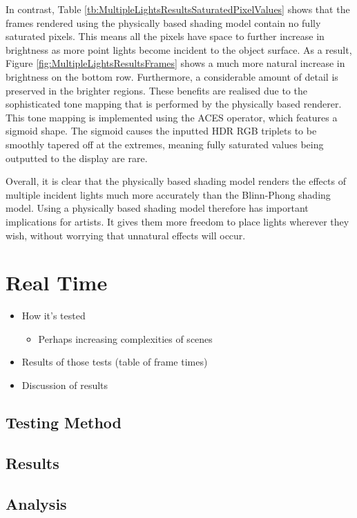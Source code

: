 In contrast, Table \ref{tb:MultipleLightsResultsSaturatedPixelValues} shows that the frames rendered using the physically based shading model contain no fully saturated pixels. This means all the pixels have space to further increase in brightness as more point lights become incident to the object surface. As a result, Figure \ref{fig:MultipleLightsResultsFrames} shows a much more natural increase in brightness on the bottom row. Furthermore, a considerable amount of detail is preserved in the brighter regions. These benefits are realised due to the sophisticated tone mapping that is performed by the physically based renderer. This tone mapping is implemented using the ACES operator, which features a sigmoid shape. The sigmoid causes the inputted HDR RGB triplets to be smoothly tapered off at the extremes, meaning fully saturated values being outputted to the display are rare.

Overall, it is clear that the physically based shading model renders the effects of multiple incident lights much more accurately than the Blinn-Phong shading model. Using a physically based shading model therefore has important implications for artists. It gives them more freedom to place lights wherever they wish, without worrying that unnatural effects will occur.

\section{Real Time}

\begin{itemize}
	\item How it's tested
	\begin{itemize}
		\item Perhaps increasing complexities of scenes
	\end{itemize}
	\item Results of those tests (table of frame times)
	\item Discussion of results
\end{itemize}

\subsection{Testing Method}

\subsection{Results}

\subsection{Analysis}
